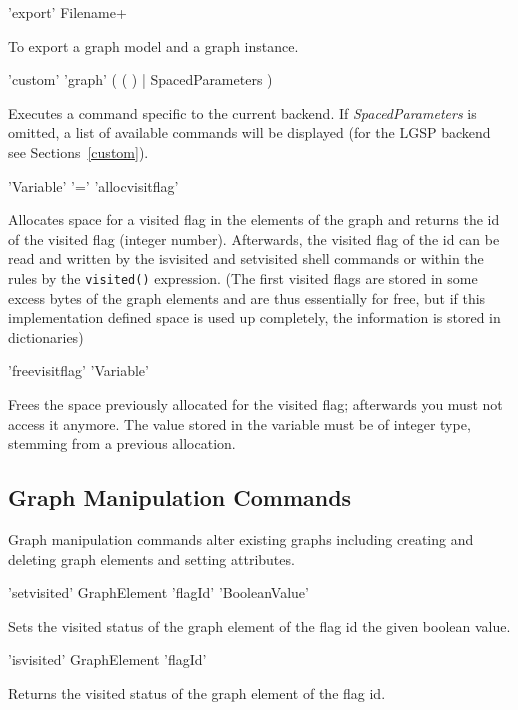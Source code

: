 \begin{rail}
  'export' Filename+
\end{rail}
To export a graph model and a graph instance.

\begin{rail}
  'custom' 'graph' ( ( ) | SpacedParameters )
\end{rail}
Executes a command specific to the current backend. If \emph{SpacedParameters} is omitted, a list of available commands will be displayed (for the LGSP backend see Sections~\ref{custom}).

\begin{rail}
'Variable' '=' 'allocvisitflag'
\end{rail}
Allocates space for a visited flag in the elements of the graph and returns the id of the visited flag (integer number). Afterwards, the visited flag of the id can be read and written by the isvisited and setvisited shell commands or within the rules by the \texttt{visited()} expression.
(The first visited flags are stored in some excess bytes of the graph elements and are thus essentially for free, but if this implementation defined space is used up completely, the information is stored in dictionaries)

\begin{rail}
'freevisitflag' 'Variable'
\end{rail}
Frees the space previously allocated for the visited flag; afterwards you must not access it anymore. The value stored in the variable must be of integer type, stemming from a previous allocation.


\subsection{Graph Manipulation Commands}
\label{mani}
Graph manipulation commands alter existing graphs including creating and deleting graph elements and setting attributes.

\begin{rail} 
'setvisited' GraphElement 'flagId' 'BooleanValue'
\end{rail}
Sets the visited status of the graph element of the flag id the given boolean value.

\begin{rail}
'isvisited' GraphElement 'flagId'
\end{rail}
Returns the visited status of the graph element of the flag id.


